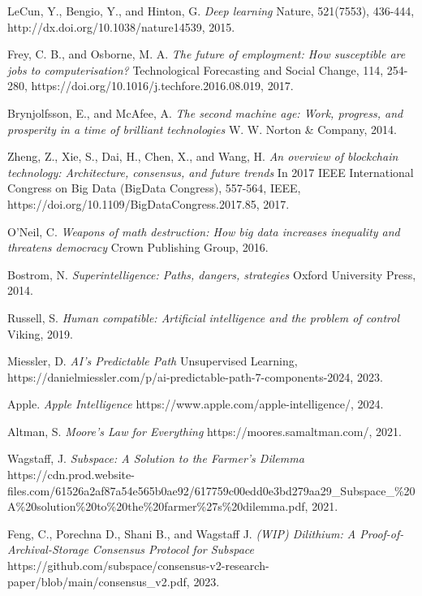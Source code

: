 \documentclass[conference]{IEEEtran}
\begin{document}
\begin{thebibliography}{}

LeCun, Y., Bengio, Y., and Hinton, G. \emph{Deep learning} Nature, 521(7553), 436-444, http://dx.doi.org/10.1038/nature14539, 2015.

Frey, C. B., and Osborne, M. A. \emph{The future of employment: How susceptible are jobs to computerisation?} Technological Forecasting and Social Change, 114, 254-280, https://doi.org/10.1016/j.techfore.2016.08.019, 2017.

Brynjolfsson, E., and McAfee, A. \emph{The second machine age: Work, progress, and prosperity in a time of brilliant technologies} W. W. Norton \& Company, 2014.

Zheng, Z., Xie, S., Dai, H., Chen, X., and Wang, H. \emph{An overview of blockchain technology: Architecture, consensus, and future trends} In 2017 IEEE International Congress on Big Data (BigData Congress), 557-564, IEEE, https://doi.org/10.1109/BigDataCongress.2017.85, 2017.

O'Neil, C. \emph{Weapons of math destruction: How big data increases inequality and threatens democracy} Crown Publishing Group, 2016.

Bostrom, N. \emph{Superintelligence: Paths, dangers, strategies} Oxford University Press, 2014.

Russell, S. \emph{Human compatible: Artificial intelligence and the problem of control} Viking, 2019.

Miessler, D. \emph{AI's Predictable Path} Unsupervised Learning, https://danielmiessler.com/p/ai-predictable-path-7-components-2024, 2023.

Apple. \emph{Apple Intelligence} https://www.apple.com/apple-intelligence/, 2024.

Altman, S. \emph{Moore's Law for Everything} https://moores.samaltman.com/, 2021.

Wagstaff, J. \emph{Subspace: A Solution to the Farmer’s Dilemma} https://cdn.prod.website-files.com/61526a2af87a54e565b0ae92/617759c00edd0e3bd279aa29\_Subspace\_\%20A\%20solution\%20to\%20the\%20farmer\%27s\%20dilemma.pdf, 2021.

Feng, C., Porechna D., Shani B., and Wagstaff J. \emph{(WIP) Dilithium: A Proof-of-Archival-Storage Consensus Protocol for Subspace}
https://github.com/subspace/consensus-v2-research-paper/blob/main/consensus\_v2.pdf, 2023.


\end{thebibliography}
\end{document}
